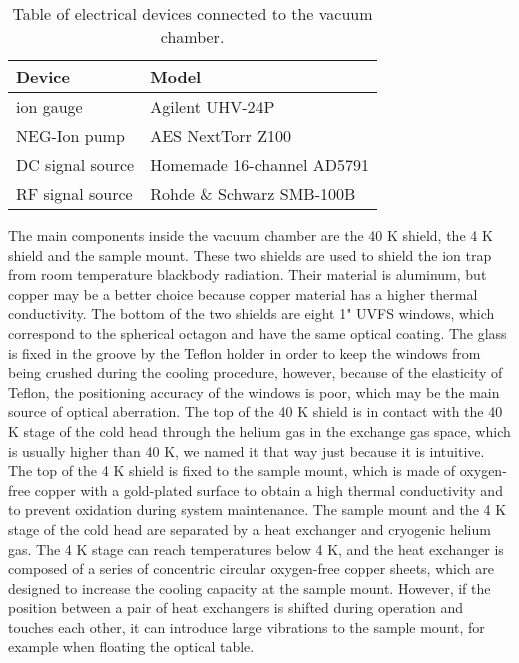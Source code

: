 \begin{table}
    \centering
    \caption{Table of electrical devices connected to the vacuum chamber.}
    \begin{tabular}{ll}
        \toprule
        Device           & Model                      \\
        \midrule
        ion gauge        & Agilent UHV-24P            \\
        NEG-Ion pump     & AES NextTorr Z100          \\
        DC signal source & Homemade 16-channel AD5791 \\
        RF signal source & Rohde \& Schwarz SMB-100B  \\
        \bottomrule
    \end{tabular}
\end{table}

The main components inside the vacuum chamber are the 40 K shield, the 4 K shield and the sample mount. These two shields are used to shield the ion trap from room temperature blackbody radiation. Their material is aluminum, but copper may be a better choice because copper material has a higher thermal conductivity. The bottom of the two shields are eight 1" UVFS windows, which correspond to the spherical octagon and have the same optical coating. The glass is fixed in the groove by the Teflon holder in order to keep the windows from being crushed during the cooling procedure, however, because of the elasticity of Teflon, the positioning accuracy of the windows is poor, which may be the main source of optical aberration. The top of the 40 K shield is in contact with the 40 K stage of the cold head through the helium gas in the exchange gas space, which is usually higher than 40 K, we named it that way just because it is intuitive. The top of the 4 K shield is fixed to the sample mount, which is made of oxygen-free copper with a gold-plated surface to obtain a high thermal conductivity and to prevent oxidation during system maintenance. The sample mount and the 4 K stage of the cold head are separated by a heat exchanger and cryogenic helium gas. The 4 K stage can reach temperatures below 4 K, and the heat exchanger is composed of a series of concentric circular oxygen-free copper sheets, which are designed to increase the cooling capacity at the sample mount. However, if the position between a pair of heat exchangers is shifted during operation and touches each other, it can introduce large vibrations to the sample mount, for example when floating the optical table.

